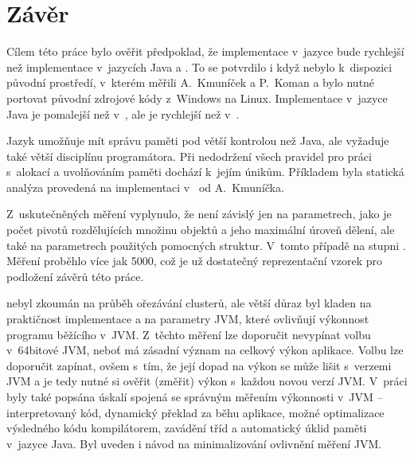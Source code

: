 \chapter{Závěr}

Cílem této práce bylo ověřit předpoklad, že implementace  v~jazyce \CC{} bude rychlejší než implementace v~jazycích Java a \CS{}.
To se potvrdilo i když nebylo k~dispozici původní prostředí, v~kterém měřili A.~Kmuníček a P.~Koman a bylo nutné portovat původní zdrojové kódy \CC{} z~Windows na Linux.
Implementace v~jazyce Java je pomalejší než v~\CC{}, ale je rychlejší než v~\CS{}.

Jazyk \CC{} umožňuje mít správu paměti pod větší kontrolou než Java, ale vyžaduje také větší disciplínu programátora.
Při nedodržení všech pravidel pro práci s~alokací a uvolňováním paměti dochází k~jejím únikům.
Příkladem byla statická analýza provedená na implementaci v~\CC{} od A.~Kmuníčka.

Z~uskutečněných měření vyplynulo, že \MIndex{} není závislý jen na parametrech, jako je počet pivotů rozdělujících množinu objektů a jeho maximální úroveň dělení, ale také na parametrech použitých pomocných struktur.
V~tomto případě na stupni \BPTree.
Měření proběhlo více jak \num{5000}, což je už dostatečný reprezentační vzorek pro podložení závěrů této práce.

\MIndex{} nebyl zkoumán na průběh ořezávání clusterů, ale větší důraz byl kladen na praktičnost implementace a na parametry JVM, které ovlivňují výkonnost programu běžícího v~JVM.
Z~těchto měření lze doporučit nevypínat volbu  v~64bitové JVM, neboť má zásadní význam na celkový výkon aplikace.
Volbu  lze doporučit zapínat, ovšem s~tím, že její dopad na výkon se může lišit s~verzemi JVM a je tedy nutné si ověřit (změřit) výkon s~každou novou verzí JVM.
V~práci byly také popsána úskalí spojená se správným měřením výkonnosti v~JVM -- interpretovaný kód, dynamický překlad \bytecode{} za běhu aplikace, možné optimalizace výsledného kódu kompilátorem, zavádění tříd a automatický úklid paměti v~jazyce Java.
Byl uveden i návod na minimalizování ovlivnění měření  JVM.

